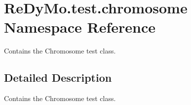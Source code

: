 \hypertarget{namespaceReDyMo_1_1test_1_1chromosome}{}\section{Re\+Dy\+Mo.\+test.\+chromosome Namespace Reference}
\label{namespaceReDyMo_1_1test_1_1chromosome}


Contains the Chromosome test class.  




\subsection{Detailed Description}
Contains the Chromosome test class. 